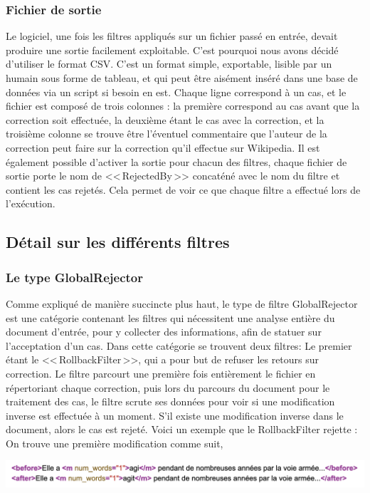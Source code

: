 \documentclass[11pt]{article}
\begin{document}
\subsubsection{Fichier de sortie}
Le logiciel, une fois les filtres appliqu\'{e}s sur un fichier pass\'{e} en entr\'{e}e, devait produire une sortie facilement exploitable. C'est pourquoi nous avons d\'{e}cid\'{e} d'utiliser le format CSV. C'est un format simple, exportable, lisible par un humain sous forme de tableau, et qui peut \^{e}tre ais\'{e}ment ins\'{e}r\'{e} dans une base de donn\'{e}es via un script si besoin en est. Chaque ligne correspond \`{a} un cas, et le fichier est compos\'{e} de trois colonnes : la premi\`{e}re correspond au cas avant que la correction soit effectu\'{e}e, la deuxi\`{e}me \'{e}tant le cas avec la correction, et la troisi\`{e}me colonne se trouve \^{e}tre l'\'{e}ventuel commentaire que l'auteur de la correction peut faire sur la correction qu'il effectue sur Wikipedia.
Il est \'{e}galement possible d'activer la sortie pour chacun des filtres, chaque fichier de sortie porte le nom de <<\,RejectedBy\,>> concat\'{e}n\'{e} avec le nom du filtre et contient les cas rejet\'{e}s. Cela permet de voir ce que chaque filtre a effectu\'{e} lors de l'ex\'{e}cution.

\subsection{D\'{e}tail sur les diff\'{e}rents filtres}
\subsubsection{Le type GlobalRejector}
Comme expliqu\'{e} de mani\`{e}re succincte plus haut, le type de filtre GlobalRejector est une cat\'{e}gorie contenant les filtres qui n\'{e}cessitent une analyse enti\`{e}re du document d'entr\'{e}e, pour y collecter des informations, afin de statuer sur l'acceptation d'un cas. 
	Dans cette cat\'{e}gorie se trouvent deux filtres:
Le premier \'{e}tant le <<\,RollbackFilter\,>>, qui a pour but de refuser les retours sur correction. Le filtre parcourt une premi\`{e}re fois enti\`{e}rement le fichier en r\'{e}pertoriant chaque correction, puis lors du parcours du document pour le traitement des cas, le filtre scrute ses donn\'{e}es pour voir si une modification inverse est effectu\'{e}e \`{a} un moment. S'il existe une modification inverse dans le document, alors le cas est rejet\'{e}.
Voici un exemple que le RollbackFilter rejette :
On trouve une premi\`{e}re modification comme suit,
\begin{center}
\includegraphics[width=14cm]{exemple10.png} %
\end{center}
\end{document}
